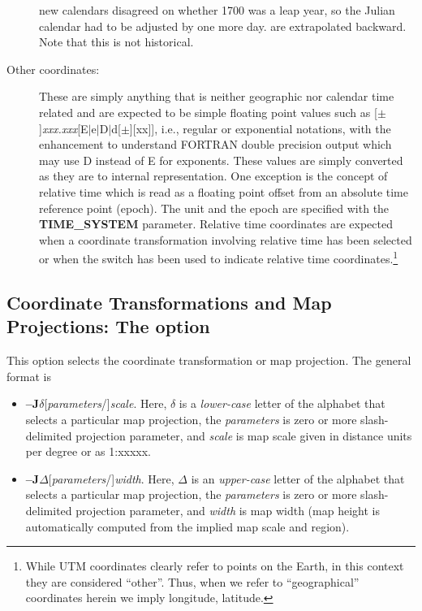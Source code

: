 \begin{description}
{new calendars disagreed on whether 1700 was a leap year, so the Julian calendar had to be adjusted by one more day.} are extrapolated
backward.  Note that this is not historical.
\item [Other coordinates:]  These are simply anything that is neither geographic nor calendar time related and are
expected to be simple floating point values such as [$\pm$]\emph{xxx.xxx}[E$|$e$|$D$|$d[$\pm$][xx]], i.e., regular or exponential
notations, with the enhancement to understand FORTRAN double precision output which may use D instead of E for exponents.
These values are simply converted as they are to internal representation.  One exception is the concept
of relative time which is read as a floating point offset from an absolute time reference point (epoch).  The unit and the
epoch are specified with the \textbf{TIME\_SYSTEM} parameter.  Relative time coordinates are expected when a coordinate transformation
involving relative time has been selected or when the  switch has been used to indicate relative time coordinates.\footnote{While
UTM coordinates clearly refer to points on the Earth, in this context they are considered ``other''.  Thus, when we
refer to ``geographical'' coordinates herein we imply longitude, latitude.}
\end{description}

\subsection{Coordinate Transformations and Map Projections: The  option}


This option selects the coordinate transformation or map projection.  The general format is

\begin{itemize}
\item \textbf{--J}$\delta$[\emph{parameters}/]\emph{scale}.  Here, $\delta$ is a \emph{lower-case}
letter of the alphabet that selects a particular map projection, the \emph{parameters}
is zero or more slash-delimited projection parameter, and \emph{scale} is map scale given in
distance units per degree or as 1:xxxxx.
\item \textbf{--J}$\Delta$[\emph{parameters}/]\emph{width}.  Here, $\Delta$ is an \emph{upper-case}
letter of the alphabet that selects a particular map projection, the \emph{parameters}
is zero or more slash-delimited projection parameter, and \emph{width} is map width (map
height is automatically computed from the implied map scale and region).
\end{itemize}

